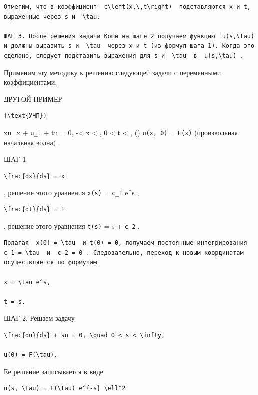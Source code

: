 \documentclass[
  ukrainian,
]{article}
\begin{document}
\begin{verbatim}
Отметим, что в коэффициент  c\left(x,\,t\right)  подставляются x и t, выраженные через s и  \tau.

ШАГ 3. После решения задачи Коши на шаге 2 получаем функцию  u(s,\tau)  и должны выразить s и  \tau  через x и t (из формул шага 1). Когда это сделано, следует подставить выражения для s и  \tau  в  u(s,\tau) .
\end{verbatim}

Применим эту методику к решению следующей задачи с переменными
коэффициентами.

ДРУГОЙ ПРИМЕР

\begin{verbatim}
(\text{УЧП})
\end{verbatim}

xu\_x + \texttt{u\_t} + tu = 0, -\infty \textless{} x \textless{}
\infty, 0 \textless{} t \textless{} \infty, ()
\texttt{u(x,\ 0)} = \texttt{F(x)} (произвольная начальная волна).

ШΑГ 1.

\begin{verbatim}
\frac{dx}{ds} = x
\end{verbatim}

, решение этого уравнения \texttt{x(s)} = \texttt{c\_1} e\^{}s ,

\begin{verbatim}
\frac{dt}{ds} = 1
\end{verbatim}

, решение этого уравнения \texttt{t(s)} = s + \texttt{c\_2} .

\begin{verbatim}
Полагая  x(0) = \tau  и t(0) = 0, получаем постоянные интегрирования  c_1 = \tau  и  c_2 = 0 . Следовательно, переход к новым координатам осуществляется по формулам

x = \tau e^s,

t = s.
\end{verbatim}

ШАГ 2. Решаем задачу

\begin{verbatim}
\frac{du}{ds} + su = 0, \quad 0 < s < \infty,

u(0) = F(\tau).
\end{verbatim}

Ее решение записывается в виде

\begin{verbatim}
u(s, \tau) = F(\tau) e^{-s} \ell^2
\end{verbatim}
\end{document}
